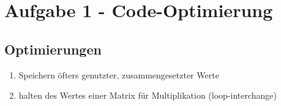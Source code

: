 \section{Aufgabe 1 - Code-Optimierung}



\label{lst:matmul0-orig}



\subsection{Optimierungen}
\begin{enumerate}
	\item Speichern öfters genutzter, zusammengesetzter Werte \\
				
	\item halten des Wertes einer Matrix für Multiplikation (loop-interchange)\\
	
\end{enumerate}

\label{lst:matmul0}

